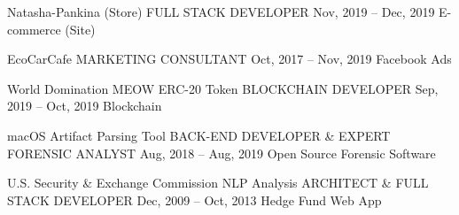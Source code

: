 \vspace{-2mm}

\begin{cventries}

  \cventry
    {Natasha-Pankina (Store)} %
    {FULL STACK DEVELOPER} %
    {Nov, 2019 – Dec, 2019} %
    {E-commerce (Site)} %
    {
    \begin{cvitems} %
    \vspace{-5mm}
    \end{cvitems}
    }
    \vspace{-1.5mm}
    \cventry
    {EcoCarCafe} %
    {MARKETING CONSULTANT} %
    {Oct, 2017 – Nov, 2019} %
    {Facebook Ads} %
    {
    \begin{cvitems} %
    \vspace{-5mm}
    \end{cvitems}
    }
    \vspace{-1.5mm}
    \cventry
    {World Domination MEOW ERC-20 Token}
    {BLOCKCHAIN DEVELOPER}
    {Sep, 2019 – Oct, 2019}
    {Blockchain}
    {
    \begin{cvitems} %
    \vspace{-5mm}
    \end{cvitems}
    }
    \vspace{-1.5mm}
    \cventry
    {macOS Artifact Parsing Tool}
    {BACK-END DEVELOPER \& EXPERT FORENSIC ANALYST}
    {Aug, 2018 – Aug, 2019}
    {Open Source Forensic Software}
    {
    \begin{cvitems} %
    \vspace{-5mm}
    \end{cvitems}
    }
    
    \vspace{-1.5mm}
    \cventry
    {U.S. Security \& Exchange Commission NLP Analysis}
    {ARCHITECT \& FULL STACK DEVELOPER}
    {Dec, 2009 – Oct, 2013}
    {Hedge Fund Web App}
    {
    \begin{cvitems} %
    \vspace{-5mm}
    \end{cvitems}
    }
    

\end{cventries}
